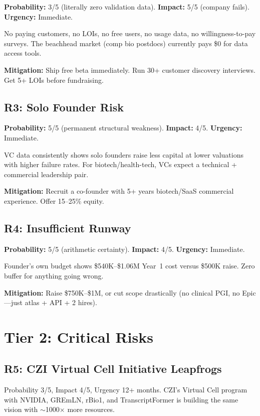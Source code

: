 \documentclass[10pt,twocolumn,letterpaper]{article}
\begin{document}
\textbf{Probability:} 3/5 (literally zero validation data).
\textbf{Impact:} 5/5 (company fails).
\textbf{Urgency:} Immediate.

No paying customers, no LOIs, no free users, no usage data, no
willingness-to-pay surveys. The beachhead market (comp bio postdocs) currently
pays \$0 for data access tools.

\textbf{Mitigation:} Ship free beta immediately. Run 30+ customer discovery
interviews. Get 5+ LOIs before fundraising.

\subsection{R3: Solo Founder Risk}

\textbf{Probability:} 5/5 (permanent structural weakness).
\textbf{Impact:} 4/5.
\textbf{Urgency:} Immediate.

VC data consistently shows solo founders raise less capital at lower valuations
with higher failure rates. For biotech/health-tech, VCs expect a technical +
commercial leadership pair.

\textbf{Mitigation:} Recruit a co-founder with 5+ years biotech/SaaS
commercial experience. Offer 15--25\% equity.

\subsection{R4: Insufficient Runway}

\textbf{Probability:} 5/5 (arithmetic certainty).
\textbf{Impact:} 4/5.
\textbf{Urgency:} Immediate.

Founder's own budget shows \$540K--\$1.06M Year~1 cost versus \$500K raise.
Zero buffer for anything going wrong.

\textbf{Mitigation:} Raise \$750K--\$1M, or cut scope drastically (no clinical
PGI, no Epic---just atlas + API + 2 hires).

\section{Tier 2: Critical Risks}
\label{sec:critical}

\subsection{R5: CZI Virtual Cell Initiative Leapfrogs}

Probability 3/5, Impact 4/5, Urgency 12+ months. CZI's Virtual Cell program
with NVIDIA, GREmLN, rBio1, and TranscriptFormer is building the same vision
with $\sim$1000$\times$ more resources.
\end{document}
